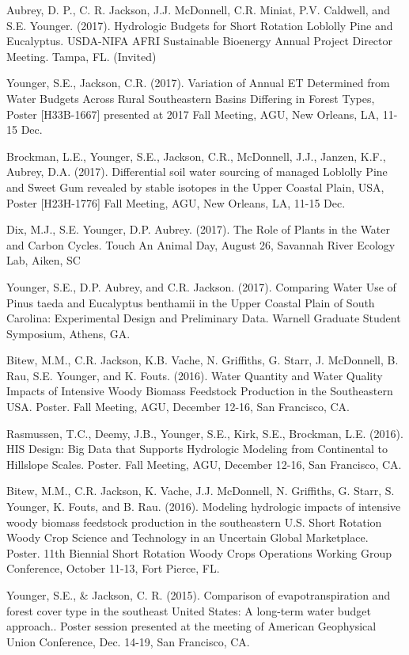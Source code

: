 \documentclass[10pt,letterpaper]{article}
\begin{document}
\begin{hangparas}{.25in}{1}
		Aubrey, D. P., C. R. Jackson, J.J. McDonnell, C.R. Miniat, P.V. Caldwell, and S.E. Younger. (2017). Hydrologic Budgets for Short Rotation Loblolly Pine and Eucalyptus. USDA-NIFA AFRI Sustainable Bioenergy Annual Project Director Meeting. Tampa, FL. (Invited)
		
		Younger, S.E., Jackson, C.R. (2017). Variation of Annual ET Determined from Water Budgets Across Rural Southeastern Basins Differing in Forest Types, Poster [H33B-1667] presented at 2017 Fall Meeting, AGU, New Orleans, LA, 11-15 Dec.
		
		Brockman, L.E., Younger, S.E., Jackson, C.R., McDonnell, J.J., Janzen, K.F., Aubrey, D.A. (2017). Differential soil water sourcing of managed Loblolly Pine and Sweet Gum revealed by stable isotopes in the Upper Coastal Plain, USA, Poster [H23H-1776] Fall Meeting, AGU, New Orleans, LA, 11-15 Dec.
		
		Dix, M.J., S.E. Younger, D.P. Aubrey. (2017). The Role of Plants in the Water and Carbon Cycles. Touch An Animal Day, August 26, Savannah River Ecology Lab, Aiken, SC
		
		Younger, S.E., D.P. Aubrey, and C.R. Jackson. (2017). Comparing Water Use of Pinus taeda and Eucalyptus benthamii in the Upper Coastal Plain of South Carolina: Experimental Design and Preliminary Data. Warnell Graduate Student Symposium, Athens, GA. 
		
		Bitew, M.M., C.R. Jackson, K.B. Vache, N. Griffiths, G. Starr, J. McDonnell, B. Rau, S.E. Younger, and K. Fouts. (2016). Water Quantity and Water Quality Impacts of Intensive Woody Biomass Feedstock Production in the Southeastern USA. Poster. Fall Meeting, AGU, December 12-16, San Francisco, CA. 
		
		Rasmussen, T.C., Deemy, J.B., Younger, S.E., Kirk, S.E., Brockman, L.E. (2016). HIS Design: Big Data that Supports Hydrologic Modeling from Continental to Hillslope Scales. Poster. Fall Meeting, AGU, December 12-16, San Francisco, CA. 
		
		Bitew, M.M., C.R. Jackson, K. Vache, J.J. McDonnell, N. Griffiths, G. Starr, S. Younger, K. Fouts, and B. Rau. (2016). Modeling hydrologic impacts of intensive woody biomass feedstock production in the southeastern U.S. Short Rotation Woody Crop Science and Technology in an Uncertain Global Marketplace. Poster. 11th Biennial Short Rotation Woody Crops Operations Working Group Conference, October 11-13, Fort Pierce, FL.
		
		Younger, S.E., \& Jackson, C. R. (2015). Comparison of evapotranspiration and forest cover type in the southeast United States: A long-term water budget approach.. Poster session presented at the meeting of American Geophysical Union Conference, Dec. 14-19, San Francisco, CA.
		

\end{hangparas}
\end{document}
